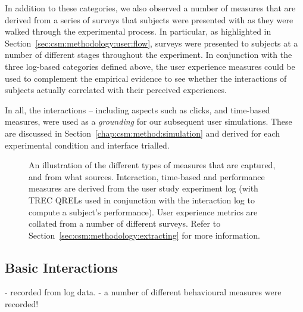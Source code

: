 In addition to these categories, we also observed a number of  measures that are derived from a series of surveys that subjects were presented with as they were walked through the experimental process. In particular, as highlighted in Section~\ref{sec:csm:methodology:user:flow}, surveys were presented to subjects at a number of different stages throughout the experiment. In conjunction with the three log-based categories defined above, the user experience measures could be used to complement the empirical evidence to see whether the interactions of subjects actually correlated with their perceived experiences.

In all, the interactions -- including aspects such as clicks, and time-based measures, were used as a \emph{grounding} for our subsequent user simulations. These are discussed in Section~\ref{chap:csm:method:simulation} and derived for each experimental condition and interface trialled.

\begin{figure}[t!]
    \centering
    \caption[Examples of Evaluation Measures]{An illustration of the different types of measures that are captured, and from what sources. Interaction, time-based and performance measures are derived from the user study experiment log (with TREC QRELs used in conjunction with the interaction log to compute a subject's performance). User experience metrics are collated from a number of different surveys. Refer to Section~\ref{sec:csm:methodology:extracting} for more information.}
    \label{fig:evaluation_methodology}
\end{figure}

\subsection{Basic Interactions}
- recorded from log data.
- a number of different behavioural measures were recorded!

